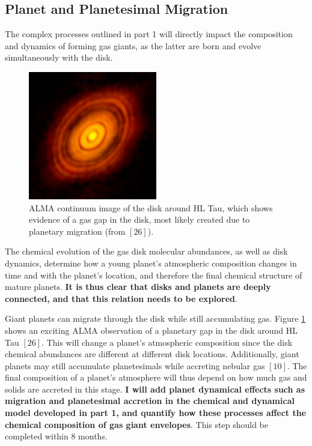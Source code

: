\documentclass[12pt, letterpaper]{article}
\begin{document}


\subsection{Planet and Planetesimal Migration}

The complex processes outlined in part 1 will directly impact the composition and dynamics of forming gas giants, as the latter are born and evolve simultaneously with the disk. 
\begin{figure}[h!]
\centering
\includegraphics[width=0.5\textwidth]{HLTau_nrao}
\caption{ALMA continuum image of the disk around HL Tau, which shows evidence of a gas gap in the disk, most likely created due to planetary migration (from $[26]$).}
\label{fig:HLtau}
\end{figure}
The chemical evolution of the gas disk molecular abundances, as well as disk dynamics, determine how a young planet's atmospheric composition changes in time and with the planet's location, and therefore the final chemical structure of mature planets. \textbf{It is thus clear that disks and planets are deeply connected, and that this relation needs to be explored}. %

Giant planets can migrate through the disk while still accumulating gas. Figure \ref{fig:HLtau} shows an exciting ALMA observation of a planetary gap in the disk around HL Tau $[26]$. This will change a planet's atmospheric composition since the disk chemical abundances are different at different disk locations. Additionally, giant planets may still accumulate planetesimals while accreting nebular gas $[10]$. The final composition of a planet's atmosphere will thus depend on how much gas and solids are accreted in this stage. \textbf{I will add planet dynamical effects such as migration and planetesimal accretion in the chemical and dynamical model developed in part 1, and quantify how these processes affect the chemical composition of gas giant envelopes}. This step should be completed within 8 months.
\end{document}
